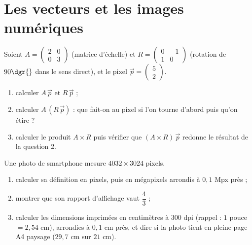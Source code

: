 \clearpage
\chapter{Les vecteurs et les images numériques}

\begin{exercice}
Soient $A = \begin{pmatrix} 2 & 0 \\ 0 & 3 \end{pmatrix}$ (matrice d'échelle) et $R = \begin{pmatrix} 0 & -1 \\ 1 & 0 \end{pmatrix}$ (rotation de $90\dgr{}$ dans le sens direct), et le pixel $\vec{p} = \begin{pmatrix} 5 \\ 2 \end{pmatrix}$.
\begin{enumerate}
\item calculer $A\,\vec{p}$ et $R\,\vec{p}$ ;
\item calculer $A\,(R\,\vec{p})$ : que fait-on au pixel si l'on tourne d'abord puis qu'on étire ?
\item calculer le produit $A \times R$ puis vérifier que $(A \times R)\,\vec{p}$ redonne le résultat de la question 2.
\end{enumerate}
\end{exercice}

\begin{exercice}
Une photo de smartphone mesure $4032 \times 3024$ pixels.
\begin{enumerate}
\item calculer sa définition en pixels, puis en mégapixels arrondis à $0{,}1$ Mpx près ;
\item montrer que son rapport d'affichage vaut $\dfrac{4}{3}$ ;
\item calculer les dimensions imprimées en centimètres à $300$ dpi (rappel : $1$ pouce $= 2{,}54$ cm), arrondies à $0{,}1$ cm près, et dire si la photo tient en pleine page A4 paysage ($29{,}7$ cm sur $21$ cm).
\end{enumerate}
\end{exercice}

